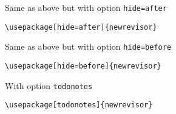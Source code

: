 \documentclass[a4paper,11pt]{ydoc}
\begin{document}
\begin{center}
  \begin{raggedright}
  Same as above but with option \verb|hide=after|\\[2em]
\end{raggedright}
\par\noindent%
\begin{minipage}{\textwidth}
\begin{lstlisting}[language={[latex]tex},gobble=4,frame=lines,caption={},numbers=none]
    \usepackage[hide=after]{newrevisor}
\end{lstlisting}
\end{minipage}
\fbox{}
\newpage
  \begin{raggedright}
    Same as above but with option \verb|hide=before|\\[2em]
  \end{raggedright}
\par\noindent%
\begin{minipage}{\textwidth}
\begin{lstlisting}[language={[latex]tex},gobble=4,frame=lines,caption={},numbers=none]
    \usepackage[hide=before]{newrevisor}
\end{lstlisting}
\end{minipage}
\fbox{}
\newpage
  \begin{raggedright}
    With option \verb|todonotes|\\[2em]
  \end{raggedright}
\par\noindent%
\begin{minipage}{\textwidth}
\begin{lstlisting}[language={[latex]tex},gobble=4,frame=lines,caption={},numbers=none]
    \usepackage[todonotes]{newrevisor}
\end{lstlisting}
\end{minipage}
\fbox{}
\end{center}
\end{document}

